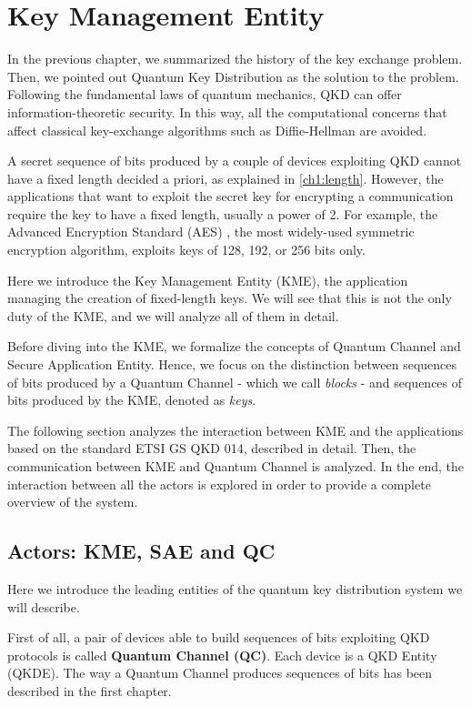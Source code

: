 \chapter{Key Management Entity}
\label{ch:kme}%
In the previous chapter, we summarized the history of the key exchange problem. Then, we pointed out Quantum Key Distribution as the solution to the problem. Following the fundamental laws of quantum mechanics, QKD can offer information-theoretic security. In this way, all the computational concerns that affect classical key-exchange algorithms such as Diffie-Hellman are avoided.

A secret sequence of bits produced by a couple of devices exploiting QKD cannot have a fixed length decided a priori, as explained in \ref{ch1:length}. However, the applications that want to exploit the secret key for encrypting a communication require the key to have a fixed length, usually a power of 2. For example, the Advanced Encryption Standard (AES) \cite{aes}, the most widely-used symmetric encryption algorithm, exploits keys of 128, 192, or 256 bits only.

Here we introduce the Key Management Entity (KME), the application managing the creation of fixed-length keys. We will see that this is not the only duty of the KME, and we will analyze all of them in detail.

Before diving into the KME, we formalize the concepts of Quantum Channel and Secure Application Entity. Hence, we focus on the distinction between sequences of bits produced by a Quantum Channel - which we call \textit{blocks} - and sequences of bits produced by the KME, denoted as \textit{keys}.

The following section analyzes the interaction between KME and the applications based on the standard ETSI GS QKD 014, described in detail. Then, the communication between KME and Quantum Channel is analyzed. In the end, the interaction between all the actors is explored in order to provide a complete overview of the system.

\section{Actors: KME, SAE and QC}
Here we introduce the leading entities of the quantum key distribution system we will describe.

First of all, a pair of devices able to build sequences of bits exploiting QKD protocols is called \textbf{Quantum Channel (QC)}. Each device is a QKD Entity (QKDE). The way a Quantum Channel produces sequences of bits has been described in the first chapter.

